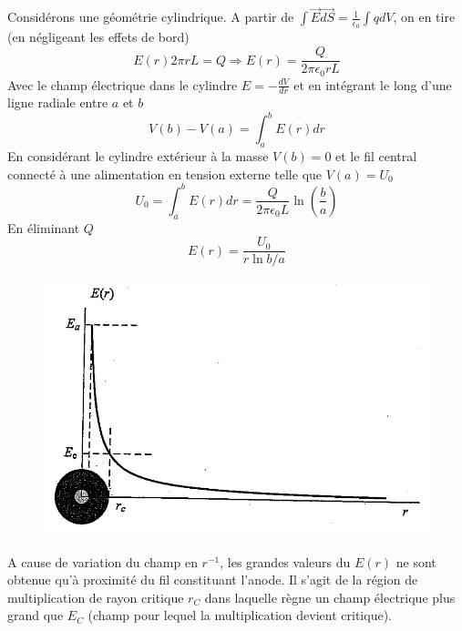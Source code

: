 Considérons une géométrie cylindrique. A partir de $\int \vec{E} \vec{dS}=\frac{1}{\epsilon_0} \int q
dV$, on en tire (en négligeant les effets de bord)
\begin{equation}
E(r)2\pi rL=Q \Rightarrow E(r)=\frac{Q}{2\pi\epsilon_0 rL}
\end{equation}
Avec le champ électrique dans le cylindre $E=-\frac{dV}{dr}$ et en intégrant le long d'une ligne
radiale entre $a$ et $b$
\begin{equation}
V(b)-V(a)=\int_a^b E(r)dr
\end{equation}
En considérant le cylindre extérieur à la masse $V(b)=0$ et le fil central connecté à une alimentation
en tension externe telle que $V(a)=U_0$
\begin{equation}
U_0=\int_a^b E(r)dr=\frac{Q}{2\pi\epsilon_0 L}\ln{\left(\frac{b}{a}\right)}
\end{equation}
En éliminant $Q$
\begin{equation}
E(r)=\frac{U_0}{r\ln{b/a}}
\end{equation}

	\begin{figure}
	\vspace{-15mm}
	\includegraphics[scale=0.25]{ch8/image6}
	\end{figure}
	
A cause de variation du champ en $r^{-1}$, les grandes valeurs du $E(r)$ ne sont obtenue qu'à
proximité du fil constituant l'anode. Il s'agit de la région de multiplication de rayon critique
$r_C$ dans laquelle règne un champ électrique plus grand que $E_C$ (champ pour lequel la
multiplication devient critique).



